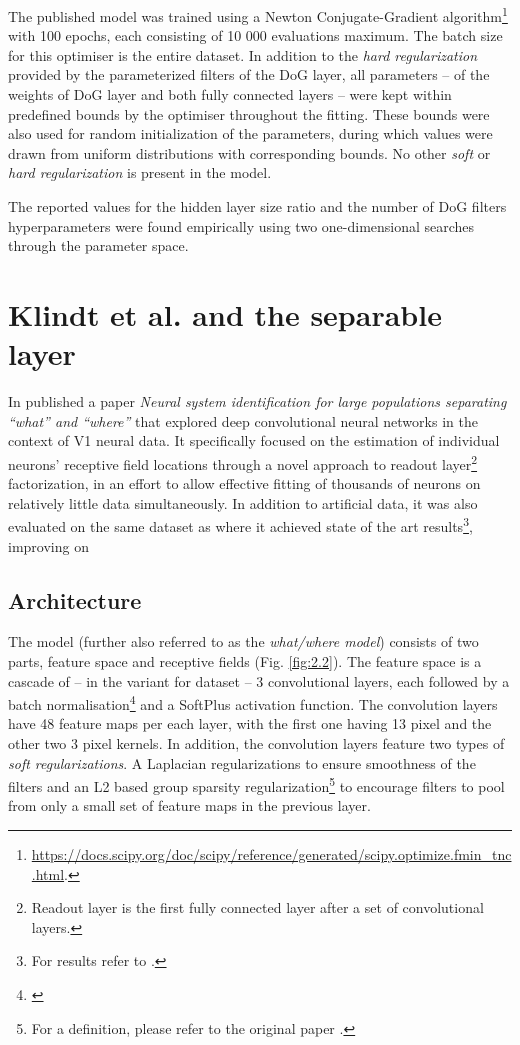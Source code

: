 The published model was trained using a Newton Conjugate-Gradient algorithm\footnote{\href{https://docs.scipy.org/doc/scipy/reference/generated/scipy.optimize.fmin_tnc.html}{https://docs.scipy.org/doc/scipy/reference/generated/scipy.optimize.fmin\_tnc.html}.} with 100 epochs, each consisting of 10 000 evaluations maximum. The batch size for this optimiser is the entire dataset. In addition to the \textit{hard regularization} provided by the parameterized filters of the DoG layer, all parameters -- of the weights of DoG layer and both fully connected layers -- were kept within predefined bounds by the optimiser throughout the fitting. These bounds were also used for random initialization of the parameters, during which values were drawn from uniform distributions with corresponding bounds. No other \textit{soft} or \textit{hard regularization} is present in the model. 

The reported values for the hidden layer size ratio and the number of DoG filters hyperparameters were found empirically using two one-dimensional searches through the parameter space.

\section{Klindt et al. and the separable layer}\label{ch:2.2}

In \citeyear{klindt} \citeauthor{klindt} published a paper \textit{Neural system identification for large populations separating “what” and “where”} that explored deep convolutional neural networks in the context of V1 neural data. It specifically focused on the estimation of individual neurons’ receptive field locations through a novel approach to readout layer\footnote{Readout layer is the first fully connected layer after a set of convolutional layers.} factorization, in an effort to allow effective fitting of thousands of neurons on relatively little data simultaneously. In addition to artificial data, it was also evaluated on the same dataset as \cite{antolik} where it achieved state of the art results\footnote{For results refer to .}, improving on \cite{antolik}

\subsection{Architecture}

The model (further also referred to as the \textit{what/where model}) consists of two parts, feature space and receptive fields (Fig. \ref{fig:2.2}). The feature space is a cascade of -- in the variant for \citeauthor{antolik} dataset -- 3 convolutional layers, each followed by a batch normalisation\footnote{\citep{2015arXiv150203167I}} and a SoftPlus activation function. The convolution layers have 48 feature maps per each layer, with the first one having 13 pixel and the other two 3 pixel kernels. In addition, the convolution layers feature two types of \textit{soft regularizations}. A Laplacian regularizations to ensure smoothness of the filters and an L2 based group sparsity regularization\footnote{For a definition, please refer to the original paper \citep{klindt}.} to encourage filters to pool from only a small set of feature maps in the previous layer.

